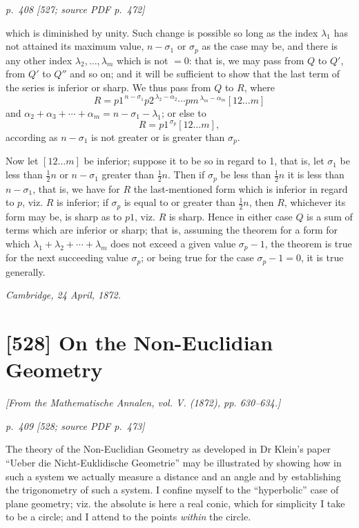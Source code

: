 \documentclass[11pt,a4paper]{article}
\newcommand{\pagemarker}[3]{\par\bigskip\noindent\textit{p.~#1 [#2; source PDF p.~#3]}\par\smallskip}
\begin{document}
\pagemarker{408}{527}{472}

which is diminished by unity. Such change is possible so long as the index
$\lambda_1$ has not attained its maximum value, $n-\sigma_1$ or $\sigma_p$ as the case
may be, and there is any other index $\lambda_2,\ldots,\lambda_m$ which is not $=0$:
that is, we may pass from $Q$ to $Q'$, from $Q'$ to $Q''$ and so on; and it will be
sufficient to show that the last term of the series is inferior or sharp. We thus pass
from $Q$ to $R$, where
\[
R=p1^{\,n-\sigma_1}p2^{\,\lambda_2-\alpha_2}\cdots
pm^{\,\lambda_m-\alpha_m}[12\ldots m]
\]
and $\alpha_2+\alpha_3+\cdots+\alpha_m=n-\sigma_1-\lambda_1$; or else to
\[
R=p1^{\,\sigma_p} [12\ldots m],
\]
according as $n-\sigma_1$ is not greater or is greater than $\sigma_p$.

Now let $[12\ldots m]$ be inferior; suppose it to be so in regard to 1, that is, let
$\sigma_1$ be less than $\frac12n$ or $n-\sigma_1$ greater than $\frac12n$. Then if
$\sigma_p$ be less than $\frac12n$ it is less than $n-\sigma_1$, that is, we have for $R$
the last-mentioned form which is inferior in regard to $p$, viz. $R$ is inferior; if
$\sigma_p$ is equal to or greater than $\frac12n$, then $R$, whichever its form may be, is
sharp as to $p1$, viz. $R$ is sharp. Hence in either case $Q$ is a sum of terms which
are inferior or sharp; that is, assuming the theorem for a form for which
$\lambda_1+\lambda_2+\cdots+\lambda_m$ does not exceed a given value $\sigma_p-1$,
the theorem is true for the next succeeding value $\sigma_p$; or being true for the case
$\sigma_p-1=0$, it is true generally.

\noindent\textit{Cambridge, 24 April, 1872.}

\clearpage
\section*{[528] On the Non-Euclidian Geometry}
\begin{center}
\textit{[From the Mathematische Annalen, vol. V. (1872), pp. 630--634.]}
\end{center}

\pagemarker{409}{528}{473}

The theory of the Non-Euclidian Geometry as developed in Dr Klein's paper
``Ueber die Nicht-Euklidische Geometrie'' may be illustrated by showing how in such
a system we actually measure a distance and an angle and by establishing the
trigonometry of such a system. I confine myself to the ``hyperbolic'' case of plane
geometry; viz. the absolute is here a real conic, which for simplicity I take to be a
circle; and I attend to the points \textit{within} the circle.
\end{document}
